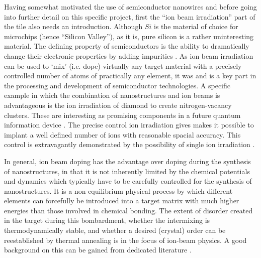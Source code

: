 Having somewhat motivated the use of semiconductor nanowires and before going into further detail on this specific project, first the ``ion beam irradiation'' part of the tile also needs an introduction. Although $Si$ is the material of choice for microchips (hence ``Silicon Valley''), as it is, pure silicon is a rather uninteresting material. The defining property of semiconductors is the ability to dramatically change their electronic properties by adding impurities \cite{sze_physics_2006}. As ion beam irradiation can be used to `mix' (i.e. dope) virtually any target material with a precisely controlled number of atoms of practically any element, it was and is a key part in the processing and development of semiconductor technologies. A specific example in which the combination of nanostructures and ion beams is advantageous is the ion irradiation of diamond to create nitrogen-vacancy clusters. These are interesting as promising components in a future quantum information device \cite{babinec_diamond_2010}. The precise control ion irradiation gives makes it possible to implant a well defined number of ions with reasonable spacial accuracy. This control is extravagantly demonstrated by the possibility of single ion irradiation \cite{meijer_concept_2006,ohdomari_single-ion_2008}. 

In general, ion beam doping has the advantage over doping during the synthesis of nanostructures, in that it is not inherently limited by the chemical potentials and dynamics which typically have to be carefully controlled for the synthesis of nanostructures. It is a non-equilibrium physical process by which different elements can forcefully be introduced into a target matrix with much higher energies than those involved in chemical bonding. The extent of disorder created in the target during this bombardment, whether the intermixing is thermodynamically stable, and whether a desired (crystal) order can be reestablished by thermal annealing is in the focus of ion-beam physics. A good background on this can be gained from dedicated literature \cite{ziegler_stopping_1985,nastasi/mayer/hirvonen_ion-solid_2008,schmidt_ion_2012,eckstein_computer_1991}.

